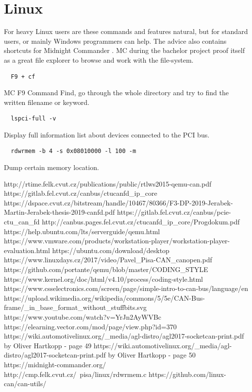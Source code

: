 \documentclass{ctuthesis}
\begin{document}
 \section{Linux}
  For heavy Linux users are these commands and features natural, but for standard users, or mainly Windows programmers can help. The advice also contains shortcuts for Midnight Commander \cite{mc}. MC during the bachelor project proof itself as a great file explorer to browse and work with the file-system.
  \begin{verbatim}  F9 + cf\end{verbatim}
  MC F9 Command Find, go through the whole directory and try to find the written filename or keyword.
  \begin{verbatim}  lspci-full -v\end{verbatim}
  Display full information list about devices connected to the PCI bus.
  \begin{verbatim}  rdwrmem -b 4 -s 0x08010000 -l 100 -m\end{verbatim}
  Dump certain memory location. \cite{rdwrmem}
 
 
\renewcommand\bibname{References}
\begin{thebibliography}{1}
 http://rtime.felk.cvut.cz/publications/public/rtlws2015-qemu-can.pdf
 https://gitlab.fel.cvut.cz/canbus/ctucanfd\_ip\_core
 https://dspace.cvut.cz/bitstream/handle/10467/80366/F3-DP-2019-Jerabek-Martin-Jerabek-thesis-2019-canfd.pdf
 https://gitlab.fel.cvut.cz/canbus/pcie-ctu\_can\_fd
 http://canbus.pages.fel.cvut.cz/ctucanfd\_ip\_core/Progdokum.pdf
 https://help.ubuntu.com/lts/serverguide/qemu.html
 https://www.vmware.com/products/workstation-player/workstation-player-evaluation.html
 https://ubuntu.com/download/desktop
 https://www.linuxdays.cz/2017/video/Pavel\_Pisa-CAN\_canopen.pdf
 https://github.com/portante/qemu/blob/master/CODING\_STYLE
 https://www.kernel.org/doc/html/v4.10/process/coding-style.html
 https://www.csselectronics.com/screen/page/simple-intro-to-can-bus/language/en
 https://upload.wikimedia.org/wikipedia/commons/5/5e/CAN-Bus-frame/\_in\_base\_format\_without\_stuffbits.svg
 https://www.youtube.com/watch?v=YrJn2AyWVBc
 https://elearning.vector.com/mod/page/view.php?id=370
 https://wiki.automotivelinux.org/\_media/agl-distro/agl2017-socketcan-print.pdf by Oliver Hartkopp - page 49
 https://wiki.automotivelinux.org/\_media/agl-distro/agl2017-socketcan-print.pdf by Oliver Hartkopp - page 50
 https://midnight-commander.org/
 http://cmp.felk.cvut.cz/~pisa/linux/rdwrmem.c
 https://github.com/linux-can/can-utils/
\end{thebibliography}
\end{document}
